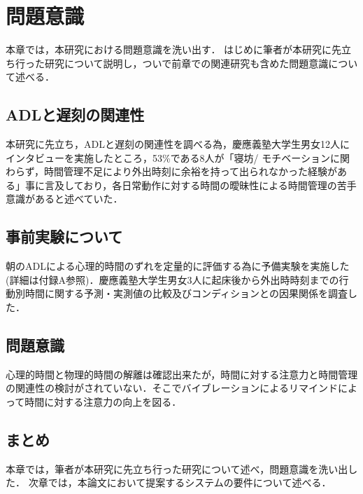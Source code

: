 \chapter{問題意識}
本章では，本研究における問題意識を洗い出す．
はじめに筆者が本研究に先立ち行った研究について説明し，ついで前章での関連研究も含めた問題意識について述べる．

\section{ADLと遅刻の関連性}
本研究に先立ち，ADLと遅刻の関連性を調べる為，慶應義塾大学生男女12人にインタビューを実施したところ，53\%である8人が「寝坊/ モチベーションに関わらず，時間管理不足により外出時刻に余裕を持って出られなかった経験がある」事に言及しており，各日常動作に対する時間の曖昧性による時間管理の苦手意識があると述べていた．

\section{事前実験について}
朝のADLによる心理的時間のずれを定量的に評価する為に予備実験を実施した(詳細は付録A参照)．慶應義塾大学生男女3人に起床後から外出時時刻までの行動別時間に関する予測・実測値の比較及びコンディションとの因果関係を調査した．
\section{問題意識}
心理的時間と物理的時間の解離は確認出来たが，時間に対する注意力と時間管理の関連性の検討がされていない．そこでバイブレーションによるリマインドによって時間に対する注意力の向上を図る．

\section{まとめ}
本章では，筆者が本研究に先立ち行った研究について述べ，問題意識を洗い出した．
次章では，本論文において提案するシステムの要件について述べる．